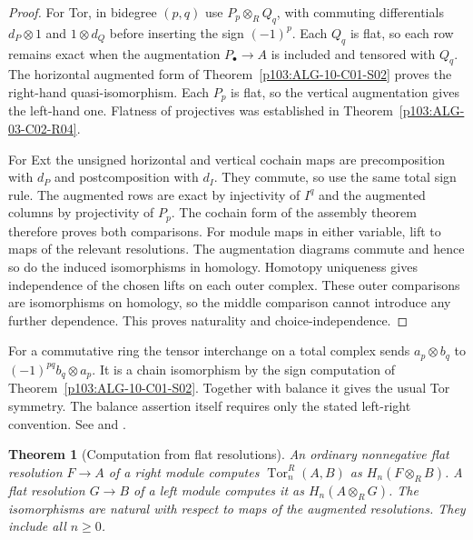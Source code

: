 \documentclass[11pt,oneside,openany]{book}
\newtheorem{theorem}{Theorem}[chapter]
\theoremstyle{definition}
\theoremstyle{remark}
\begin{document}
\begin{proof}
For Tor, in bidegree \((p,q)\) use \(P_p\otimes_R Q_q\),
with commuting differentials \(d_P\otimes 1\) and \(1\otimes d_Q\)
before inserting the sign \((-1)^p\). Each \(Q_q\) is flat, so
each row remains exact when the augmentation
\(P_\bullet\to A\) is included and tensored with \(Q_q\).
The horizontal augmented form of
Theorem~\ref{p103:ALG-10-C01-S02} proves the right-hand
quasi-isomorphism. Each \(P_p\) is flat, so the vertical
augmentation gives the left-hand one. Flatness of projectives
was established in Theorem~\ref{p103:ALG-03-C02-R04}.

For Ext the unsigned horizontal and vertical cochain maps are
precomposition with \(d_P\) and postcomposition with \(d_I\).
They commute, so use the same total sign rule. The augmented rows
are exact by injectivity of \(I^q\) and the augmented columns by
projectivity of \(P_p\). The cochain form of the assembly theorem
therefore proves both comparisons.
For module maps in either variable, lift to maps of the relevant
resolutions. The augmentation diagrams commute and hence so do
the induced isomorphisms in homology. Homotopy uniqueness gives
independence of the chosen lifts on each outer complex. These
outer comparisons are isomorphisms on homology, so the middle
comparison cannot introduce any further dependence. This proves
naturality and choice-independence.
\end{proof}

For a commutative ring the tensor interchange on a total complex
sends \(a_p\otimes b_q\) to \((-1)^{pq}b_q\otimes a_p\).
It is a chain isomorphism by the sign computation of
Theorem~\ref{p103:ALG-10-C01-S02}. Together with balance it gives
the usual Tor symmetry. The balance assertion itself requires
only the stated left-right convention. See
\cite[Theorems 2.7.2 and 2.7.6]{weibel} and
\cite[Theorem 6.32]{rotman}.

\begin{theorem}[Computation from flat resolutions]
\label{p103:ALG-10-C02-R03}
An ordinary nonnegative flat resolution \(F\to A\) of a right
module computes \(\operatorname{Tor}^R_n(A,B)\) as
\(H_n(F\otimes_R B)\). A flat resolution \(G\to B\) of a left
module computes it as \(H_n(A\otimes_R G)\).
The isomorphisms are natural with respect to maps of the
augmented resolutions. They include all \(n\geq0\).
\end{theorem}
\end{document}
